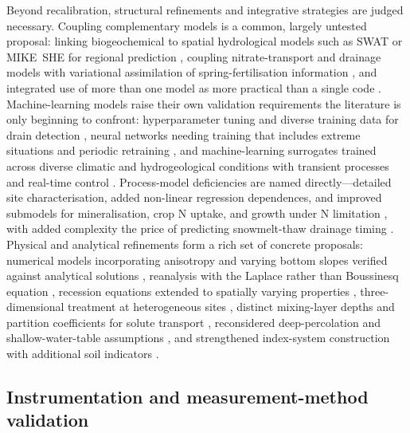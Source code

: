 \documentclass[11pt]{article}
\begin{document}
Beyond recalibration, structural refinements and integrative strategies are
judged necessary. Coupling complementary models is a common, largely untested
proposal: linking biogeochemical to spatial hydrological models such as SWAT or
MIKE~SHE for regional prediction \parencite{Li2006}, coupling nitrate-transport
and drainage models with variational assimilation of spring-fertilisation
information \parencite{Chelil2022}, and integrated use of more than one model as
more practical than a single code \parencite{Singh2019b,Apostel2021}.
Machine-learning models raise their own validation requirements the literature
is only beginning to confront: hyperparameter tuning and diverse training data
for drain detection \parencite{Song2021}, neural networks needing training that
includes extreme situations and periodic retraining \parencite{Yang2000}, and
machine-learning surrogates trained across diverse climatic and hydrogeological
conditions with transient processes and real-time control
\parencite{Lei2026,Schneider2022}. Process-model deficiencies are named
directly---detailed site characterisation, added non-linear regression
dependences, and improved submodels for mineralisation, crop N uptake, and
growth under N limitation \parencite{Ahuja2007,Ikenberry2017}, with added
complexity the price of predicting snowmelt-thaw drainage timing
\parencite{Feyereisen2007}. Physical and analytical refinements form a rich set
of concrete proposals: numerical models incorporating anisotropy and varying
bottom slopes verified against analytical solutions \parencite{Lin2025,Kacimov2000},
reanalysis with the Laplace rather than Boussinesq equation \parencite{Bouarfa2000},
recession equations extended to spatially varying properties \parencite{Cooke2001},
three-dimensional treatment at heterogeneous sites \parencite{Mohanty1997},
distinct mixing-layer depths and partition coefficients for solute transport
\parencite{Shalit1996}, reconsidered deep-percolation and shallow-water-table
assumptions \parencite{Kolars2019}, and strengthened index-system construction
with additional soil indicators \parencite{Hou2018}.

\subsection{Instrumentation and measurement-method validation}
\end{document}
